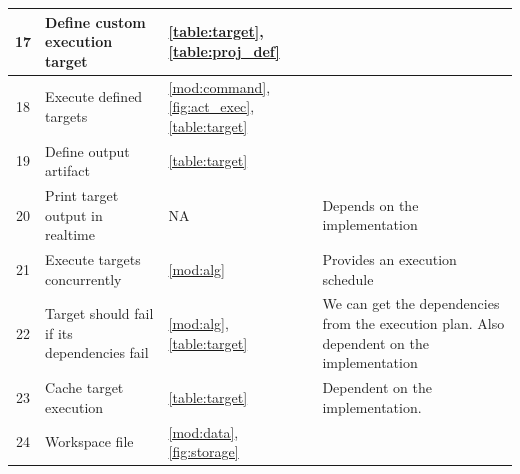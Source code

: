 \documentclass[11pt]{article}
\begin{document}
\begin{tabular}[h!]{c|p{5cm}|p{2cm}| p{4cm}}
  \hline
  17 & Define custom execution target & \ref{table:target}, \ref{table:proj_def} & \\
  \hline
  18 & Execute defined \glspl{target} & \ref{mod:command}, \ref{fig:act_exec}, \ref{table:target} & \\
  \hline
  19 & Define output artifact & \ref{table:target} & \\
  \hline
  20 & Print target output in realtime & NA & Depends on the implementation \\
  \hline
  21 & Execute targets concurrently & \ref{mod:alg} & Provides an execution schedule \\
  \hline
  22 & Target should fail if its dependencies fail & \ref{mod:alg}, \ref{table:target} & We can get the dependencies from the execution plan. Also dependent on the implementation\\
  \hline
  23 & Cache target execution & \ref{table:target} & Dependent on the implementation. \\
  \hline
  24 & Workspace file & \ref{mod:data}, \ref{fig:storage} &
\end{tabular}
\end{document}

